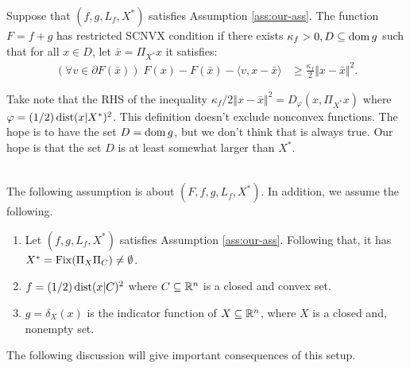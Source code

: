 \documentclass[12pt]{article}
\begin{document}
    \begin{definition}\label{def:rel-res-scnvx}
        Suppose that $(f, g, L_f, X^*)$ satisfies Assumption \ref{ass:our-ass}. 
        The function $F = f + g$ has restricted SCNVX condition if there exists $\kappa_f > 0, D \subseteq \operatorname{dom} g$ such that for all $x \in D$, let $\bar x = \Pi_{X^*}x$ it satisfies: 
        \begin{align*}
            \left(\forall v \in \partial F(\bar x)\right)\;
            F(x) - F(\bar x) - \langle v, x - \bar x\rangle 
            &\ge \frac{\kappa_f}{2}\Vert x - \bar x\Vert^2. 
        \end{align*}
    \end{definition}
    \begin{remark}
        Take note that the RHS of the inequality $\kappa_f/2 \Vert x - \bar x\Vert^2 = D_\varphi(x, \Pi_{X^*}x)$ where $\varphi = (1/2)\operatorname{dist}(x | X^*)^2$. 
        This definition doesn't exclude nonconvex functions. 
        The hope is to have the set $D = \operatorname{dom} g$, but we don't think that is always true. 
        Our hope is that the set $D$ is at least somewhat larger than $X^*$. 
    \end{remark}
    \begin{assumption}\;\label{ass:two-sets-feasibility}\\
        The following assumption is about $(F, f, g, L_f, X^*)$. 
        In addition, we assume the following. 
        \begin{enumerate}[nosep]
            \item Let $(f, g, L_f, X^*)$ satisfies Assumption \ref{ass:our-ass}. Following that, it has $X^* = \operatorname{Fix}(\Pi_X \Pi_C) \neq \emptyset$. 
            \item $f = (1/2)\operatorname{dist}(x | C)^2$ where $C \subseteq \mathbb R^n$ is a closed and convex set. 
            \item $g = \delta_X(x)$ is the indicator function of $X \subseteq \mathbb R^n$, where $X$ is a closed and, nonempty set. 
        \end{enumerate}
    \end{assumption}
    The following discussion will give important consequences of this setup. 
\end{document}
